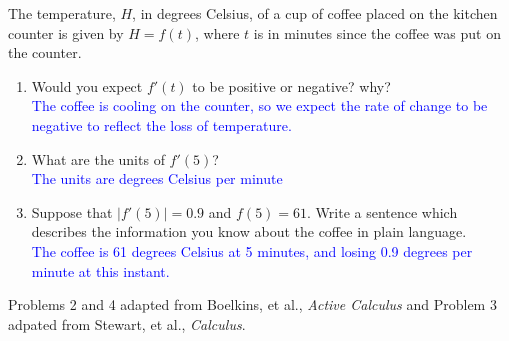 \documentclass{ximera}
\begin{document}
\begin{exercise}
    The temperature, $H$, in degrees Celsius, of a cup of coffee placed on the kitchen counter is given by $H=f(t)$, where $t$ is in minutes since the coffee was put on the counter.
    \begin{enumerate}
        \item Would you expect $f'(t)$ to be positive or negative?  why?\\
        \textcolor{blue}{The coffee is cooling on the counter, so we expect the rate of change to be negative to reflect the loss of temperature.} 
        \item What are the units of $f'(5)$?\\
        \textcolor{blue}{The units are degrees Celsius per minute}
        \item Suppose that $|f'(5)|=0.9$ and $f(5)=61$.  Write a sentence which describes the information you know about the coffee in plain language.\\
        \textcolor{blue}{The coffee is 61 degrees Celsius at 5 minutes, and losing 0.9 degrees per minute at this instant.}
    \end{enumerate}
\end{exercise}

Problems 2 and 4 adapted from Boelkins, et al., \textit{Active Calculus} and Problem 3 adpated from Stewart, et al., \textit{Calculus}.
\end{document}
